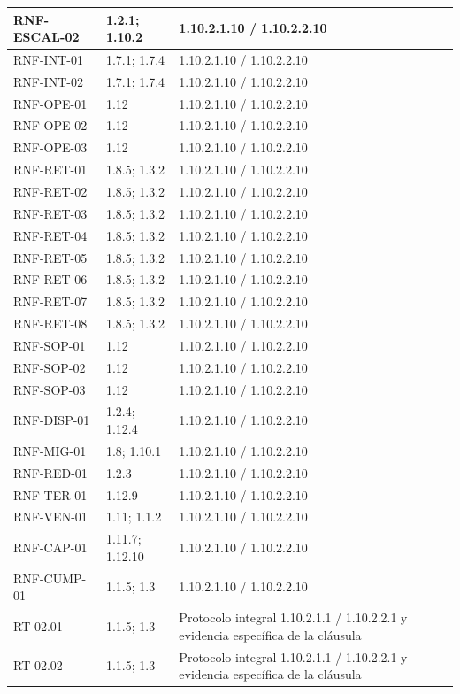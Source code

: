 \begin{longtable}{L{23mm}L{46mm}L{72mm}}
RNF-ESCAL-02 & 1.2.1; 1.10.2 & 1.10.2.1.10 / 1.10.2.2.10\\\hline
RNF-INT-01 & 1.7.1; 1.7.4 & 1.10.2.1.10 / 1.10.2.2.10\\\hline
RNF-INT-02 & 1.7.1; 1.7.4 & 1.10.2.1.10 / 1.10.2.2.10\\\hline
RNF-OPE-01 & 1.12 & 1.10.2.1.10 / 1.10.2.2.10\\\hline
RNF-OPE-02 & 1.12 & 1.10.2.1.10 / 1.10.2.2.10\\\hline
RNF-OPE-03 & 1.12 & 1.10.2.1.10 / 1.10.2.2.10\\\hline
RNF-RET-01 & 1.8.5; 1.3.2 & 1.10.2.1.10 / 1.10.2.2.10\\\hline
RNF-RET-02 & 1.8.5; 1.3.2 & 1.10.2.1.10 / 1.10.2.2.10\\\hline
RNF-RET-03 & 1.8.5; 1.3.2 & 1.10.2.1.10 / 1.10.2.2.10\\\hline
RNF-RET-04 & 1.8.5; 1.3.2 & 1.10.2.1.10 / 1.10.2.2.10\\\hline
RNF-RET-05 & 1.8.5; 1.3.2 & 1.10.2.1.10 / 1.10.2.2.10\\\hline
RNF-RET-06 & 1.8.5; 1.3.2 & 1.10.2.1.10 / 1.10.2.2.10\\\hline
RNF-RET-07 & 1.8.5; 1.3.2 & 1.10.2.1.10 / 1.10.2.2.10\\\hline
RNF-RET-08 & 1.8.5; 1.3.2 & 1.10.2.1.10 / 1.10.2.2.10\\\hline
RNF-SOP-01 & 1.12 & 1.10.2.1.10 / 1.10.2.2.10\\\hline
RNF-SOP-02 & 1.12 & 1.10.2.1.10 / 1.10.2.2.10\\\hline
RNF-SOP-03 & 1.12 & 1.10.2.1.10 / 1.10.2.2.10\\\hline
RNF-DISP-01 & 1.2.4; 1.12.4 & 1.10.2.1.10 / 1.10.2.2.10\\\hline
RNF-MIG-01 & 1.8; 1.10.1 & 1.10.2.1.10 / 1.10.2.2.10\\\hline
RNF-RED-01 & 1.2.3 & 1.10.2.1.10 / 1.10.2.2.10\\\hline
RNF-TER-01 & 1.12.9 & 1.10.2.1.10 / 1.10.2.2.10\\\hline
RNF-VEN-01 & 1.11; 1.1.2 & 1.10.2.1.10 / 1.10.2.2.10\\\hline
RNF-CAP-01 & 1.11.7; 1.12.10 & 1.10.2.1.10 / 1.10.2.2.10\\\hline
RNF-CUMP-01 & 1.1.5; 1.3 & 1.10.2.1.10 / 1.10.2.2.10\\\hline
RT-02.01 & 1.1.5; 1.3 & Protocolo integral 1.10.2.1.1 / 1.10.2.2.1 y evidencia específica de la cláusula\\\hline
RT-02.02 & 1.1.5; 1.3 & Protocolo integral 1.10.2.1.1 / 1.10.2.2.1 y evidencia específica de la cláusula\\\hline

\end{longtable}
